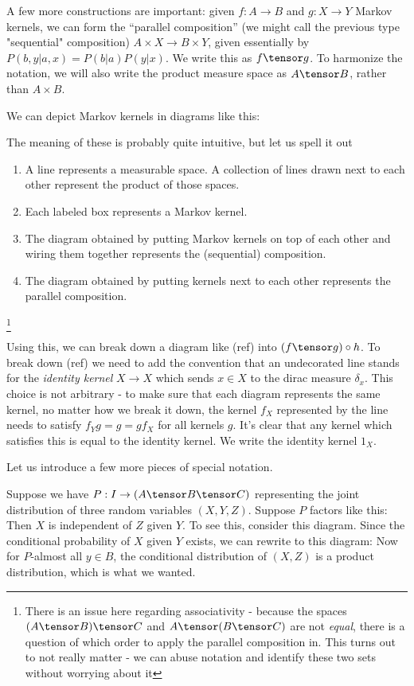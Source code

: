 \documentclass{article}
\begin{document}
A few more constructions are important: given $f:A \to B$ and $g:X \to Y$ Markov kernels, we can form the ``parallel composition'' (we might call the previous type "sequential" composition) $A \times X \to B \times Y$,
given essentially by $P(b,y|a,x) = P(b|a)P(y|x)$. We write this as $f \tensor g$. To harmonize the notation, we will also write the product measure space as $A \tensor B$, rather than $A \times B$.


We can depict Markov kernels in diagrams like this:


The meaning of these is probably quite intuitive, but let us spell it out

\begin{enumerate}
    \item A line represents a measurable space. A collection of lines drawn next to each other represent the product of those spaces. 
    \item Each labeled box represents a Markov kernel.
    \item The diagram obtained by putting Markov kernels on top of each other and wiring them together represents the (sequential) composition.
    \item The diagram obtained by putting kernels next to each other represents the parallel composition.\footnotemark
\end{enumerate}

\footnote{There is an issue here regarding associativity - because the spaces $(A \tensor B) \tensor C$ and $A \tensor (B \tensor C)$ are not \emph{equal}, there is a question of which order to apply the parallel composition in. This turns out to not really matter - we can abuse notation and identify these two sets without worrying about it}

Using this, we can break down a diagram like (ref) into $(f \tensor g) \circ h$.
To break down (ref) we need to add the convention that an undecorated line stands for the \emph{identity kernel} $X \to X$ which sends $x\in X$ to the dirac measure $\delta_x$.
This choice is not arbitrary - to make sure that each diagram represents the same kernel, no matter how we break it down, the kernel $f_X$ represented by the line needs to satisfy $f_Yg = g = gf_X$ for all kernels $g$.
It's clear that any kernel which satisfies this is equal to the identity kernel.
We write the identity kernel $1_X$.

Let us introduce a few more pieces of special notation.

\begin{example}
    Suppose we have $P: I \to (A \tensor B \tensor C)$ representing the joint distribution of three random variables $(X,Y,Z)$.
    Suppose $P$ factors like this:
    Then $X$ is independent of $Z$ given $Y$.
    To see this, consider this diagram.
    Since the conditional probability of $X$ given $Y$ exists, we can rewrite to this diagram:
    Now for $P$-almost all $y\in B$, the conditional distribution of $(X,Z)$ is a product distribution, which is what we wanted.
\end{example}
\end{document}
